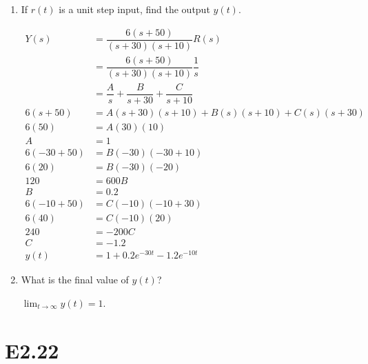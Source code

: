 \documentclass[11pt]{article}
\begin{document}
\begin{enumerate}
    \item If $r(t)$ is a unit step input, find the output $y(t)$.
    
    \begin{align*}
        Y(s) &= \dfrac{6(s + 50)}{(s + 30)(s + 10)} R(s) \\
        &= \dfrac{6(s + 50)}{(s + 30)(s + 10)} \dfrac{1}{s} \\
        &= \dfrac{A}{s} + \dfrac{B}{s + 30} + \dfrac{C}{s + 10}\\
        6(s + 50) &= A (s + 30) (s + 10) + B (s) (s + 10) + C (s) (s + 30)\\
        6(50) &= A (30)(10) \tag{$s = 0$} \\
        A &= 1 \\
        6(-30 + 50) &= B (-30) (-30 + 10) \tag{$s = -30$} \\
        6(20) &= B (-30) (-20) \\
        120 &= 600 B \\
        B &= 0.2 \\
        6(-10 + 50) &= C (-10) (-10 + 30) \tag{$s = -10$} \\
        6(40) &= C (-10) (20) \\
        240 &= -200 C \\
        C &= -1.2 \\
        y(t) &= 1 + 0.2 e^{-30t} - 1.2 e^{-10t}
    \end{align*}

    \item What is the final value of $y(t)$?
    
    $\lim_{t \xrightarrow{} \infty} y(t) = 1$.

\end{enumerate}
    
\section{E2.22}
\end{document}
